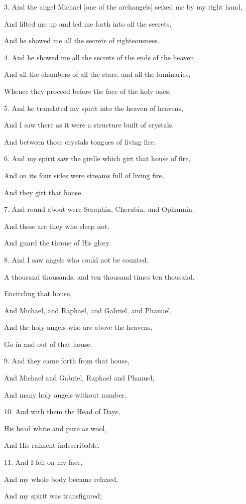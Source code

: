 3. And the angel Michael [one of the archangels] seized me by my right hand,

And lifted me up and led me forth into all the secrets,

And he showed me all the secrets of righteousness.

4. And he showed me all the secrets of the ends of the heaven,

And all the chambers of all the stars, and all the luminaries,

Whence they proceed before the face of the holy ones.

5. And he translated my spirit into the heaven of heavens,

And I saw there as it were a structure built of crystals,

And between those crystals tongues of living fire.

6. And my spirit saw the girdle which girt that house of fire,

And on its four sides were streams full of living fire,

And they girt that house.

7. And round about were Seraphin, Cherubin, and Ophannin:

And these are they who sleep not,

And guard the throne of His glory.

8. And I saw angels who could not be counted.

A thousand thousands, and ten thousand times ten thousand.

Encircling that house,

And Michael, and Raphael, and Gabriel, and Phanuel,

And the holy angels who are above the heavens,

Go in and out of that house.

9. And they came forth from that house,

And Michael and Gabriel, Raphael and Phanuel,

And many holy angels without number.

10. And with them the Head of Days,

His head white and pure as wool,

And His raiment indescribable.

11. And I fell on my face,

And my whole body became relaxed,

And my spirit was transfigured;

